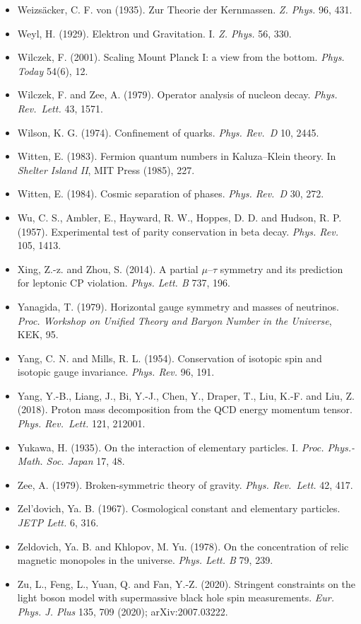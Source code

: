 \documentclass[
  11pt,
]{article}
\begin{document}
\begin{itemize}
\item
  Weizsäcker, C. F. von (1935). Zur Theorie der Kernmassen. \emph{Z. Phys.} 96, 431.
\item
  Weyl, H. (1929). Elektron und Gravitation. I. \emph{Z. Phys.} 56, 330.
\item
  Wilczek, F. (2001). Scaling Mount Planck I: a view from the bottom. \emph{Phys. Today} 54(6), 12.
\item
  Wilczek, F. and Zee, A. (1979). Operator analysis of nucleon decay. \emph{Phys. Rev.~Lett.} 43, 1571.
\item
  Wilson, K. G. (1974). Confinement of quarks. \emph{Phys. Rev.~D} 10, 2445.
\item
  Witten, E. (1983). Fermion quantum numbers in Kaluza--Klein theory. In \emph{Shelter Island II}, MIT Press (1985), 227.
\item
  Witten, E. (1984). Cosmic separation of phases. \emph{Phys. Rev.~D} 30, 272.
\item
  Wu, C. S., Ambler, E., Hayward, R. W., Hoppes, D. D. and Hudson, R. P. (1957). Experimental test of parity conservation in beta decay. \emph{Phys. Rev.} 105, 1413.
\item
  Xing, Z.-z. and Zhou, S. (2014). A partial \ensuremath{\mu}--\ensuremath{\tau} symmetry and its prediction for leptonic CP violation. \emph{Phys. Lett. B} 737, 196.
\item
  Yanagida, T. (1979). Horizontal gauge symmetry and masses of neutrinos. \emph{Proc. Workshop on Unified Theory and Baryon Number in the Universe}, KEK, 95.
\item
  Yang, C. N. and Mills, R. L. (1954). Conservation of isotopic spin and isotopic gauge invariance. \emph{Phys. Rev.} 96, 191.
\item
  Yang, Y.-B., Liang, J., Bi, Y.-J., Chen, Y., Draper, T., Liu, K.-F. and Liu, Z. (2018). Proton mass decomposition from the QCD energy momentum tensor. \emph{Phys. Rev.~Lett.} 121, 212001.
\item
  Yukawa, H. (1935). On the interaction of elementary particles. I. \emph{Proc. Phys.-Math. Soc. Japan} 17, 48.
\item
  Zee, A. (1979). Broken-symmetric theory of gravity. \emph{Phys. Rev.~Lett.} 42, 417.
\item
  Zel'dovich, Ya. B. (1967). Cosmological constant and elementary particles. \emph{JETP Lett.} 6, 316.
\item
  Zeldovich, Ya. B. and Khlopov, M. Yu. (1978). On the concentration of relic magnetic monopoles in the universe. \emph{Phys. Lett. B} 79, 239.
\item
  Zu, L., Feng, L., Yuan, Q. and Fan, Y.-Z. (2020). Stringent constraints on the light boson model with supermassive black hole spin measurements. \emph{Eur. Phys. J. Plus} 135, 709 (2020); arXiv:2007.03222.
\end{itemize}
\end{document}
